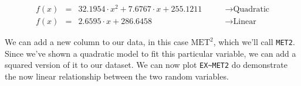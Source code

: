 \documentclass[10pt]{article}\usepackage[]{graphicx}\usepackage[]{xcolor}
\begin{document}
    \begin{equation}
        \begin{aligned}
            f(x) &=& 32.1954 \cdot x^2 + 7.6767 \cdot x + 255.1211& \qquad \to \text{Quadratic}\\
            f(x) &=& 2.6595 \cdot x + 286.6458& \qquad \to \text{Linear}
        \end{aligned}
    \end{equation}

We can add a new column to our data, in this case $\text{MET}^2$, which we'll call \texttt{MET2}. Since we've shown a
quadratic model to fit this particular variable, we can add a squared version of it to our dataset. We can now plot
\texttt{EX\textasciitilde{}MET2} do demonstrate the now linear relationship between the two random variables.
\end{document}
